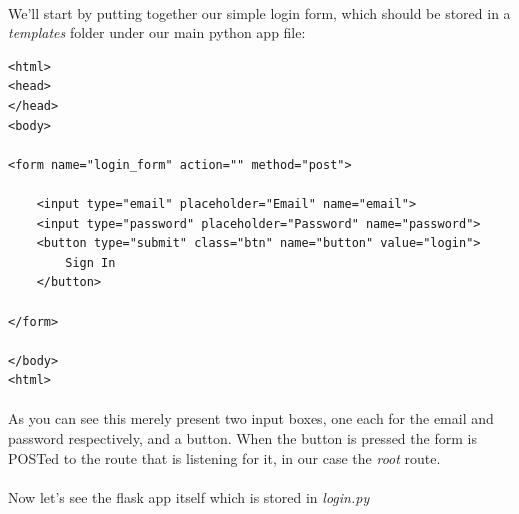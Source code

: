 \documentclass[12pt, a4paper, twoside]{book}
\begin{document}
\paragraph{} We'll start by putting together our simple login form, which should be stored in a \emph{templates} folder under our main python app file:

\begin{lstlisting}
<html>
<head>
</head>
<body>

<form name="login_form" action="" method="post">

    <input type="email" placeholder="Email" name="email">
    <input type="password" placeholder="Password" name="password">
    <button type="submit" class="btn" name="button" value="login">
        Sign In
    </button>

</form>

</body>
<html>
\end{lstlisting}

\paragraph{} As you can see this merely present two input boxes, one each for the email and password respectively, and a button. When the button is pressed the form is POSTed to the route that is listening for it, in our case the \emph{root} route.

\paragraph{} Now let's see the flask app itself which is stored in \emph{login.py}
\end{document}

